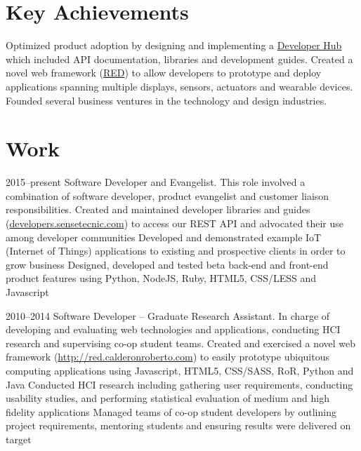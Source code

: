 \documentclass[full]{rvca}
\begin{document}
\section{Key Achievements}

\achievements
{Optimized product adoption by designing and implementing a \href{http://developers.sensetecnic.com/}{Developer Hub} which included API documentation, libraries and development guides.}
{Created a novel web framework (\href{http://red.calderonroberto.com}{RED}) to allow developers 
to prototype and deploy applications spanning multiple displays, sensors, actuators and wearable devices.}
{Founded several business ventures in the technology and design industries.}
{}

\section{Work}


{2015--present}%
{Software Developer and Evangelist.} %
{This role involved a combination of software developer, product evangelist and customer liaison responsibilities.}%
{Created and maintained developer libraries and guides (\href{http://developers.sensetecnic.com}{developers.sensetecnic.com}) to access our REST API and advocated their use among developer communities}
{Developed and demonstrated example IoT (Internet of Things) applications to existing and prospective clients in order to grow business}
{Designed, developed and tested beta back-end and front-end product features using Python, NodeJS, Ruby, HTML5, CSS/LESS and Javascript}
{}
{}

{2010--2014}%
{Software Developer -- Graduate Research Assistant.} %
{In charge of developing and evaluating web technologies and applications, conducting HCI research and supervising co-op student teams.} %
{Created and exercised a novel web framework (\href{http://red.calderonroberto.com}{http://red.calderonroberto.com}) to easily prototype ubiquitous computing applications  using Javascript, HTML5, CSS/SASS, RoR, Python and Java}
{Conducted HCI research including gathering user requirements, conducting usability studies, and performing statistical evaluation of medium and high fidelity applications}
{Managed teams of co-op student developers by outlining project requirements, mentoring students and ensuring results were delivered on target}
{}
{}
\end{document}
